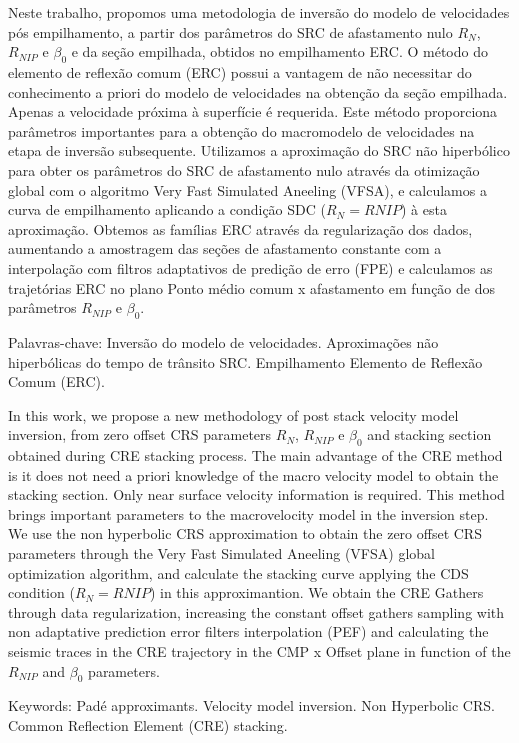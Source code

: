 \documentclass[
	12pt,				%
	openright,			%
	oneside,			%
	a4paper,			%
	english,			%
	brazil				%
	]{abntex2}
\begin{document}
\begin{resumo}
\OnehalfSpacing

Neste trabalho, propomos uma metodologia de inversão do modelo de velocidades pós empilhamento, a partir dos
parâmetros do SRC de afastamento nulo $R_N$, $R_{NIP}$ e $\beta_0$ e da seção empilhada, obtidos no empilhamento ERC.
O método do elemento de reflexão comum (ERC) possui a vantagem de 
não necessitar do conhecimento a priori do modelo de velocidades na obtenção da seção empilhada.
Apenas a velocidade próxima à superfície é requerida. 
Este método proporciona parâmetros importantes para a obtenção do
macromodelo de velocidades na etapa de inversão subsequente.
Utilizamos a aproximação do SRC não hiperbólico para
obter os parâmetros do SRC de afastamento nulo através da otimização global com o algoritmo Very Fast Simulated Aneeling (VFSA),
e calculamos a curva de empilhamento aplicando a condição SDC ($R_N=R{NIP}$) à esta aproximação.
Obtemos as famílias ERC através da regularização dos dados, aumentando a amostragem das seções de afastamento constante
com a interpolação com filtros adaptativos de predição de erro (FPE) e calculamos as trajetórias ERC 
no plano Ponto médio comum x afastamento em função de dos parâmetros $R_{NIP}$ e $\beta_0$.

\vspace{\onelineskip} 
 \noindent
 \par Palavras-chave: Inversão do modelo de velocidades. Aproximações não hiperbólicas do tempo de trânsito SRC. 
 Empilhamento Elemento de Reflexão Comum (ERC). 
\end{resumo}

\begin{resumo}
\OnehalfSpacing

In this work, we propose a new methodology of post stack velocity model inversion, from zero offset CRS parameters
$R_N$, $R_{NIP}$ e $\beta_0$ and stacking section obtained during CRE stacking process.
The main advantage of the CRE method is it does not need a priori knowledge of the macro velocity model to obtain the
stacking section. Only near surface velocity information is required.
This method brings important parameters to the macrovelocity model in the inversion step.
We use the non hyperbolic CRS approximation to obtain the zero offset 
CRS parameters through the Very Fast Simulated Aneeling (VFSA)
global optimization algorithm, and calculate the stacking curve applying the 
CDS condition ($R_N=R{NIP}$) in this approximantion.
We obtain the CRE Gathers through data regularization, increasing the constant offset gathers sampling with
non adaptative prediction error filters interpolation (PEF) and calculating the seismic traces in the CRE trajectory in the 
CMP x Offset plane in function of the $R_{NIP}$ and $\beta_0$ parameters.

\vspace{\onelineskip} 
\noindent 
\par Keywords: Padé approximants. Velocity model inversion. Non Hyperbolic CRS.
Common Reflection Element (CRE) stacking.
\end{resumo}
\end{document}
